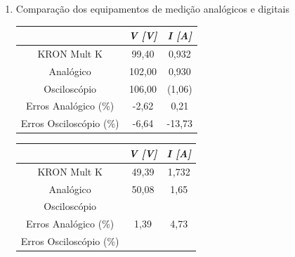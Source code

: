 \documentclass[a4paper,12pt,oneside,openany,table,xcdraw]{article}
\begin{document}
\begin{enumerate}[1 - ]
\item Comparação dos equipamentos de medição analógicos e digitais \\
\begin{table}[H]
\centering
\def\arraystretch{1.35}
\captionsetup{font=scriptsize}
 \label{cA}
\begin{tabular}{c|c|c|}
\cline{2-3}
                                              & \textit{V {[}V{]}} & \textit{I {[}A{]}} \\ \hline
\multicolumn{1}{|c|}{KRON Mult K}             & 99,40              & 0,932              \\ \hline
\multicolumn{1}{|c|}{Analógico}               & 102,00             & 0,930              \\ \hline
\multicolumn{1}{|c|}{Osciloscópio}            & 106,00             & (1,06)             \\ \hline
\multicolumn{1}{|c|}{Erros Analógico (\%)}    & -2,62              & 0,21               \\ \hline
\multicolumn{1}{|c|}{Erros Osciloscópio (\%)} & -6,64              & -13,73             \\ \hline
\end{tabular}
\end{table}

\begin{table}[H]
\centering
\def\arraystretch{1.35}
\captionsetup{font=scriptsize}
 \label{cB}
\begin{tabular}{c|c|c|}
\cline{2-3}
                                              & \textit{V {[}V{]}} & \textit{I {[}A{]}} \\ \hline
\multicolumn{1}{|c|}{KRON Mult K}             & 49,39              & 1,732              \\ \hline
\multicolumn{1}{|c|}{Analógico}               & 50,08              & 1,65               \\ \hline
\multicolumn{1}{|c|}{Osciloscópio}            &                    &                    \\ \hline
\multicolumn{1}{|c|}{Erros Analógico (\%)}    & 1,39               & 4,73               \\ \hline
\multicolumn{1}{|c|}{Erros Osciloscópio (\%)} &                    &                    \\ \hline
\end{tabular}
\end{table}


\end{enumerate}
\end{document}
